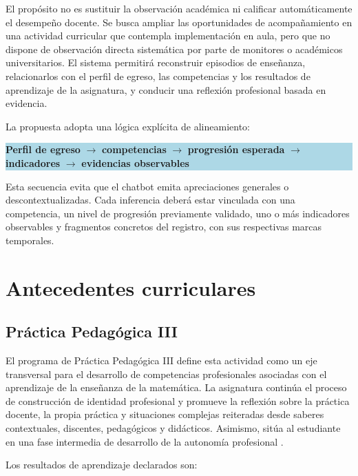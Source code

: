 \documentclass[11pt,a4paper]{article}
\begin{document}
El propósito no es sustituir la observación académica ni calificar automáticamente el desempeño docente. Se busca ampliar las oportunidades de acompañamiento en una actividad curricular que contempla implementación en aula, pero que no dispone de observación directa sistemática por parte de monitores o académicos universitarios. El sistema permitirá reconstruir episodios de enseñanza, relacionarlos con el perfil de egreso, las competencias y los resultados de aprendizaje de la asignatura, y conducir una reflexión profesional basada en evidencia.

La propuesta adopta una lógica explícita de alineamiento:

\begin{center}
\colorbox{lightblue}{
\parbox{0.92\textwidth}{
\centering
\textbf{Perfil de egreso}
$\rightarrow$
\textbf{competencias}
$\rightarrow$
\textbf{progresión esperada}
$\rightarrow$
\textbf{indicadores}
$\rightarrow$
\textbf{evidencias observables}
}}
\end{center}

Esta secuencia evita que el chatbot emita apreciaciones generales o descontextualizadas. Cada inferencia deberá estar vinculada con una competencia, un nivel de progresión previamente validado, uno o más indicadores observables y fragmentos concretos del registro, con sus respectivas marcas temporales.

\section{Antecedentes curriculares}

\subsection{Práctica Pedagógica III}

El programa de Práctica Pedagógica III define esta actividad como un eje transversal para el desarrollo de competencias profesionales asociadas con el aprendizaje de la enseñanza de la matemática. La asignatura continúa el proceso de construcción de identidad profesional y promueve la reflexión sobre la práctica docente, la propia práctica y situaciones complejas reiteradas desde saberes contextuales, discentes, pedagógicos y didácticos. Asimismo, sitúa al estudiante en una fase intermedia de desarrollo de la autonomía profesional \cite{practicaIII}.

Los resultados de aprendizaje declarados son:
\end{document}

